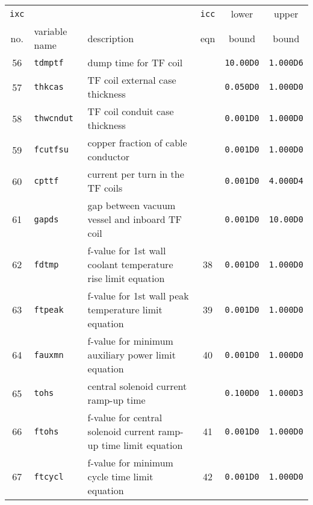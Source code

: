 \documentclass[11pt,a4paper]{report}
\begin{document}
\begin{table}[tbph]
\footnotesize
\begin{center}

\begin{tabular}{||c|l|l|c|c|c||} \hline
\texttt{ixc} &           &                                                         & \texttt{icc} & lower        & upper       \\
no. & variable name     & description                                             & eqn & bound        & bound       \\ \hline
56  & \texttt{tdmptf}   & dump time for TF coil                                   &     & \texttt{10.00D0} & \texttt{1.000D6} \\
57  & \texttt{thkcas}   & TF coil external case thickness                         &     & \texttt{0.050D0} & \texttt{1.000D0} \\
58  & \texttt{thwcndut} & TF coil conduit case thickness                          &     & \texttt{0.001D0} & \texttt{1.000D0} \\
59  & \texttt{fcutfsu}  & copper fraction of cable conductor                      &     & \texttt{0.001D0} & \texttt{1.000D0} \\
60  & \texttt{cpttf}    & current per turn in the TF coils                        &     & \texttt{0.001D0} & \texttt{4.000D4} \\
61  & \texttt{gapds}    & gap between vacuum vessel and inboard TF coil           &     & \texttt{0.001D0} & \texttt{10.00D0} \\
62  & \texttt{fdtmp}    & f-value for 1st wall coolant temperature rise limit equation & 38  & \texttt{0.001D0} & \texttt{1.000D0} \\
63  & \texttt{ftpeak}   & f-value for 1st wall peak temperature limit equation    & 39  & \texttt{0.001D0} & \texttt{1.000D0} \\
64  & \texttt{fauxmn}   & f-value for minimum auxiliary power limit equation      & 40  & \texttt{0.001D0} & \texttt{1.000D0} \\
65  & \texttt{tohs}     & central solenoid current ramp-up time                   &     & \texttt{0.100D0} & \texttt{1.000D3} \\
66  & \texttt{ftohs}    & f-value for central solenoid current ramp-up time limit equation & 41  & \texttt{0.001D0} & \texttt{1.000D0} \\
67  & \texttt{ftcycl}   & f-value for minimum cycle time limit equation           & 42  & \texttt{0.001D0} & \texttt{1.000D0} \\

\end{tabular}
\end{center}
\end{table}
\end{document}
